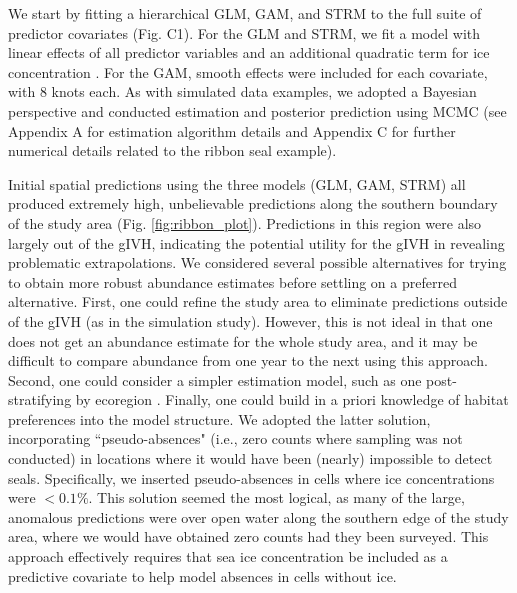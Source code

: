 \documentclass[12pt,english]{article}
\begin{document}
\begin{spacing}{1.9}
We start by fitting a hierarchical GLM, GAM, and STRM to the full suite of predictor covariates (Fig. C1).  For the GLM and STRM, we fit a model with linear effects of all predictor variables and an additional quadratic term for ice concentration \citep[seal density is often maximized at an intermediate value of ice concentration; see][]{VerHoef2013,ConnEtAl2014}. For the GAM, smooth effects were included for each covariate, with 8 knots each.  As with simulated data examples, we adopted a Bayesian perspective and conducted estimation and posterior prediction using MCMC (see Appendix A for estimation algorithm details and Appendix C for further numerical details related to the ribbon seal example).

Initial spatial predictions using the three models (GLM, GAM, STRM) all produced extremely high, unbelievable predictions along the southern boundary of the study area (Fig. \ref{fig:ribbon_plot}).  Predictions in this region were also largely out of the gIVH, indicating the potential utility for the gIVH in revealing problematic extrapolations.
We considered several possible alternatives for trying to obtain more robust abundance estimates before settling on a preferred alternative.  First, one could refine the study area to eliminate predictions outside of the gIVH (as in the simulation study).  However, this is not ideal in that one does not get an abundance estimate for the whole study area, and it may be difficult to compare abundance from one year to the next using this approach. Second, one could consider a simpler estimation model, such as one post-stratifying by ecoregion \citep[as in][]{ConnEtAl2014}.  Finally, one could build in a priori knowledge of habitat preferences into the model structure.  We adopted the latter solution, incorporating ``pseudo-absences" (i.e., zero counts where sampling was not conducted) in locations where it would have been (nearly) impossible to detect seals.  Specifically, we inserted pseudo-absences in cells where ice concentrations were $<0.1\%$.  This solution seemed the most logical, as many of the large, anomalous predictions were over open water along the southern edge of the study area, where we would have obtained zero counts had they been surveyed.  This approach effectively requires that sea ice concentration be included as a predictive covariate to help model absences in cells without ice.


\end{spacing}
\end{document}
